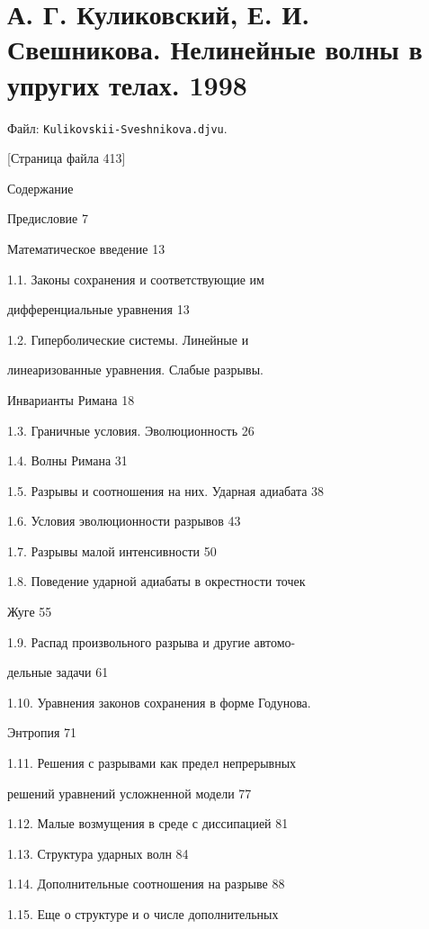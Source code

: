 \documentclass[
  11pt,
]{article}
\begin{document}

\section{А. Г. Куликовский, Е. И. Свешникова. Нелинейные волны в упругих телах. 1998}\label{section-06}

Файл: \texttt{Kulikovskii-Sveshnikova.djvu}.

\begingroup\small\setlength{\parindent}{0pt}\setlength{\parskip}{1pt}
{[}Страница файла 413{]}\par
Содержание \par
Предисловие 7 \par
Математическое введение 13 \par
1.1. Законы сохранения и соответствующие им \par
дифференциальные уравнения 13 \par
1.2. Гиперболические системы. Линейные и \par
линеаризованные уравнения. Слабые разрывы. \par
Инварианты Римана 18 \par
1.3. Граничные условия. Эволюционность 26 \par
1.4. Волны Римана 31 \par
1.5. Разрывы и соотношения на них. Ударная адиабата 38 \par
1.6. Условия эволюционности разрывов 43 \par
1.7. Разрывы малой интенсивности 50 \par
1.8. Поведение ударной адиабаты в окрестности точек \par
Жуге 55 \par
1.9. Распад произвольного разрыва и другие автомо- \par
дельные задачи 61 \par
1.10. Уравнения законов сохранения в форме Годунова. \par
Энтропия 71 \par
1.11. Решения с разрывами как предел непрерывных \par
решений уравнений усложненной модели 77 \par
1.12. Малые возмущения в среде с диссипацией 81 \par
1.13. Структура ударных волн 84 \par
1.14. Дополнительные соотношения на разрыве 88 \par
1.15. Еще о структуре и о числе дополнительных \par
\end{document}
